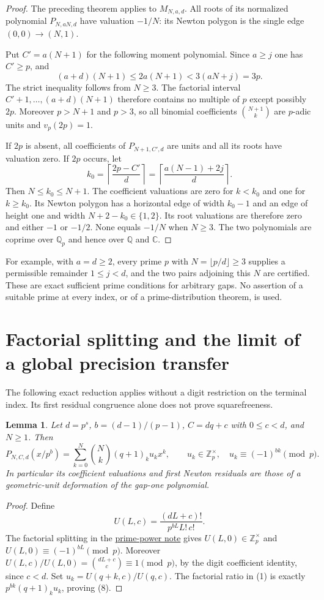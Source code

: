 \documentclass[11pt]{article}
\newtheorem{lemma}[theorem]{Lemma}
\begin{document}
\begin{proof}
The preceding theorem applies to $M_{N,a,d}$.
All roots of its normalized polynomial $P_{N,aN,d}$ have
valuation $-1/N$: its Newton polygon is the single edge
$(0,0)\longrightarrow(N,1)$.

Put $C'=a(N+1)$ for the following moment polynomial.
Since $a\ge j$ one has $C'\ge p$, and
\[
 (a+d)(N+1)\le2a(N+1)<3(aN+j)=3p.
\]
The strict inequality follows from $N\ge3$.
The factorial interval
$C'+1,\ldots,(a+d)(N+1)$ therefore contains no multiple
of $p$ except possibly $2p$.
Moreover $p>N+1$ and $p>3$, so all binomial coefficients
$\binom{N+1}k$ are $p$-adic units and $v_p(2p)=1$.

If $2p$ is absent, all coefficients of $P_{N+1,C',d}$
are units and all its roots have valuation zero.
If $2p$ occurs, let
\[
 k_0=\left\lceil\frac{2p-C'}d\right\rceil
     =\left\lceil\frac{a(N-1)+2j}{d}\right\rceil.
\]
Then $N\le k_0\le N+1$.
The coefficient valuations are zero for $k<k_0$ and one for
$k\ge k_0$. Its Newton polygon has a horizontal edge of width
$k_0-1$ and an edge of height one and width
$N+2-k_0\in\{1,2\}$.
Its root valuations are therefore zero and either $-1$ or $-1/2$.
None equals $-1/N$ when $N\ge3$.
The two polynomials are coprime over $\mathbb Q_p$ and hence
over $\mathbb Q$ and $\mathbb C$.
\end{proof}
For example, with $a=d\ge2$, every prime $p$ with
$N=\lfloor p/d\rfloor\ge3$ supplies a permissible remainder
$1\le j<d$, and the two pairs adjoining this $N$ are certified.
These are exact sufficient prime conditions for arbitrary gaps.
No assertion of a suitable prime at every index, or of a
prime-distribution theorem, is used.

\section{Factorial splitting and the limit of a global precision transfer}
The following exact reduction applies without a digit restriction on
the terminal index. Its first residual congruence alone does not prove
squarefreeness.

\begin{lemma}\label{lem:split}
Let $d=p^s$, $b=(d-1)/(p-1)$, $C=dq+c$ with $0\le c<d$,
and $N\ge1$. Then
\[
 P_{N,C,d}(x/p^b)=\sum_{k=0}^N\binom Nk(q+1)_k u_k x^k,
 \qquad u_k\in\mathbb Z_p^\times,\quad
 u_k\equiv(-1)^{bk}\pmod p.                                 \tag{8}
\]
In particular its coefficient valuations and first Newton residuals
are those of a geometric-unit deformation of the gap-one polynomial.
\end{lemma}
\begin{proof}
Define
\[
 U(L,c)=\frac{(dL+c)!}{p^{bL}L!\,c!}.
\]
The factorial splitting in the
\href{PRIME_POWER_TWO_TERM_SFC.tex}{prime-power note} gives
$U(L,0)\in\mathbb Z_p^\times$ and
$U(L,0)\equiv(-1)^{bL}\pmod p$.
Moreover $U(L,c)/U(L,0)=\binom{dL+c}{c}\equiv1\pmod p$,
by the digit coefficient identity, since $c<d$.
Set $u_k=U(q+k,c)/U(q,c)$.
The factorial ratio in (1) is exactly
$p^{bk}(q+1)_k u_k$, proving (8).
\end{proof}
\end{document}
